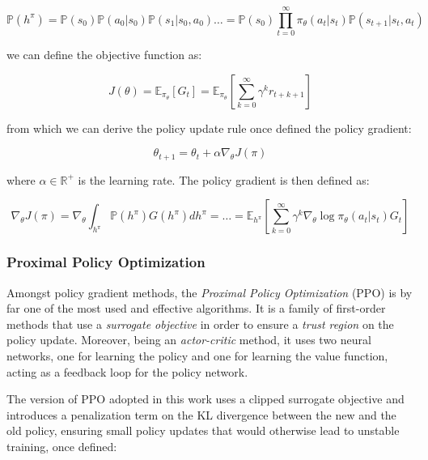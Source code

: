 \begin{equation}
    \mathbb{P}(h ^{\pi}) = \mathbb{P}(s _0) \mathbb{P}(a _0 | s _0) \mathbb{P}(s _1 | s _0, a _0) \dots = \mathbb{P}(s _0) \prod ^{\infty} _{t = 0} \pi _{\theta} (a _t | s _t) \mathbb{P}(s _{t+1} | s _t, a _t)
\end{equation}

we can define the objective function as:

\begin{equation}
    J(\theta) = \mathbb{E} _{\pi _{\theta}} \left[ G _t \right] = \mathbb{E} _{\pi _{\theta}} \left[ \sum ^{\infty} _{k = 0} \gamma ^k r _{t+k+1} \right]
\end{equation}

from which we can derive the policy update rule once defined the policy gradient:

\begin{equation}
    \theta _{t+1} = \theta _t + \alpha \nabla _{\theta} J(\pi)
\end{equation}

where $\alpha \in \mathbb{R} ^+$ is the learning rate. The policy gradient is then defined as:

\begin{equation}
    \nabla _{\theta} J(\pi) = \nabla _{\theta} \int _{h ^{\pi}} \mathbb{P}(h ^{\pi})G(h ^{\pi})dh ^{\pi} = \dots = \mathbb{E} _{h^{\pi}} \left[ \sum ^{\infty} _{k = 0} \gamma ^k \nabla _{\theta} \log \pi _{\theta} (a _t | s _t) G _t \right]
\end{equation}

\subsubsection{Proximal Policy Optimization}

Amongst policy gradient methods, the \textit{Proximal Policy Optimization} (\ac{PPO}) is by far one of the most used and effective algorithms. It is a family of first-order methods that use a \textit{surrogate objective} in order to ensure a \textit{trust region} on the policy update.
Moreover, being an \textit{actor-critic} method, it uses two neural networks, one for learning the policy and one for learning the value function, acting as a feedback  loop for the policy network.

The version of \ac{PPO} adopted in this work uses a clipped surrogate objective and introduces a penalization term on the \ac{KL} divergence between the new and the old policy, ensuring small policy updates that would otherwise lead to unstable training, once defined:

